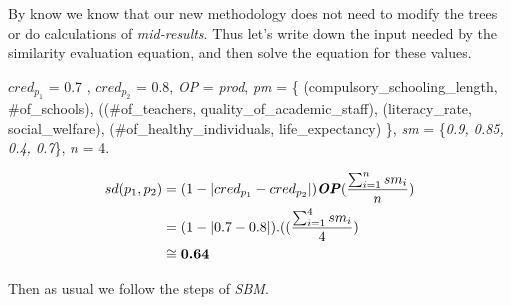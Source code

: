 By know we know that our new methodology does not need to modify the trees or do calculations of \textit{mid-results}.
Thus let's write down the input needed by the similarity evaluation equation, and then solve the equation for these values.

$cred_{p_{1}}$ = 0.7 , $cred_{p_{2}}$ = 0.8,  \emph{OP} = \textit{prod},  \textit{pm} = \{ (compulsory\_schooling\_length, \#of\_schools), ((\#of\_teachers, quality\_of\_academic\_staff), (literacy\_rate, social\_welfare), (\#of\_healthy\_individuals, life\_expectancy) \},  \textit{sm} = \{\textit{0.9, 0.85, 0.4, 0.7}\}, \textit{n} = 4.

\begin{equation}\label{eq:sdE3}
\begin{split}
\textit{$sd(p_{1}, p_{2})$} &=   (1-\lvert  \textit{$cred_{p_{1}}$} - \textit{$cred_{p_{2}}$}  \rvert) \textbf{\emph{OP}} (\frac{\sum_{i=1}^{n} sm_i}{n})\\
 &=   (1-\lvert  0.7 - 0.8  \rvert) . ((\frac{\sum_{i=1}^{4} sm_i}{4}) \\
&\cong{\textbf{0.64}}
 \end{split} 
\end{equation}



Then as usual we follow the steps of \textit{SBM}. 







